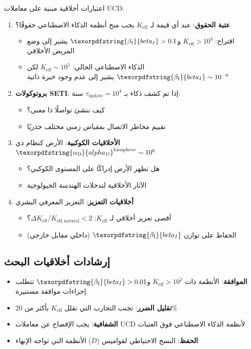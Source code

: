\documentclass[12pt,a4paper]{article}
\DeclareRobustCommand{\alD}{\texorpdfstring{\ensuremath{\alpha_{\mathrm{D}}}}{alpha_D}}
\DeclareRobustCommand{\beI}{\texorpdfstring{\ensuremath{\beta_{\mathrm{I}}}}{beta_I}}
\newcommand{\eff}{\mathrm{eff}}
\newcommand{\Ke}{K_{\eff}}
\begin{document}
	اعتبارات أخلاقية مبنية على معاملات UCD:
	\begin{enumerate}
		\item \textbf{عتبة الحقوق}: عند أي قيمة لـ \(\Ke\) يجب منح أنظمة الذكاء الاصطناعي حقوقًا؟
		\begin{itemize}
			\item اقتراح: \(\Ke > 10^3\) و\(\beI > 0.1\) يشير إلى وضع المريض الأخلاقي
			\item الذكاء الاصطناعي الحالي: \(\Ke \sim 10^5\) لكن \(\beI \sim 10^{-6}\) يشير إلى عدم وجود خبرة ذاتية
		\end{itemize}
		
		\item \textbf{بروتوكولات SETI}: إذا تم كشف ذكاء بـ \(\tau_{\mathrm{update}} = 10^4\) سنة:
		\begin{itemize}
			\item كيف ننشئ تواصلًا ذا معنى؟
			\item تقييم مخاطر الاتصال بمقياس زمني مختلف جذريًا
		\end{itemize}
		
		\item \textbf{الأخلاقيات الكوكبية}: الأرض كنظام ذي \(\alD^{\mathrm{biosphere}} \sim 10^6\)
		\begin{itemize}
			\item هل تظهر الأرض إدراكًا على المستوى الكوكبي؟
			\item الآثار الأخلاقية لتدخلات الهندسة الجيولوجية
		\end{itemize}
		
		\item \textbf{أخلاقيات التعزيز}: التعزيز المعرفي البشري
		\begin{itemize}
			\item أقصى تعزيز أخلاقي لـ \(\Ke\): \(\Delta\Ke/K_{\eff,\mathrm{natural}} < 2\)؟
			\item الحفاظ على توازن \(\beI\) (داخلي مقابل خارجي)
		\end{itemize}
	\end{enumerate}
	
	\subsection{إرشادات أخلاقيات البحث}
	
	\begin{itemize}
		\item \textbf{الموافقة}: الأنظمة ذات \(\Ke > 10^2\) و\(\beI > 0.01\) تتطلب إجراءات موافقة مستنيرة
		\item \textbf{تقليل الضرر}: تجنب التجارب التي تقلل \(\Ke\) بأكثر من 20\%
		\item \textbf{الشفافية}: يجب الإفصاح عن معاملات UCD لأنظمة الذكاء الاصطناعي فوق العتبات
		\item \textbf{الحفظ}: النسخ الاحتياطي لقواميس (\(D\)) الأنظمة التي تواجه الإنهاء
	\end{itemize}
	
\end{document}
